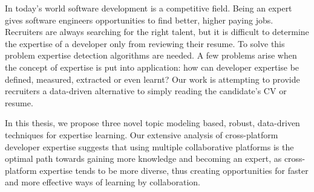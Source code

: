 In today's world software development is a competitive field. Being an expert gives software engineers opportunities to find better, higher paying jobs. Recruiters are always searching for the right talent, but it is difficult to determine the expertise of a developer only from reviewing their resume. To solve this problem expertise detection algorithms are needed. A few problems arise when the concept of expertise is put into application: how can developer expertise be defined, measured, extracted or even learnt? Our work is attempting to provide recruiters a data-driven alternative to simply reading the candidate's CV or resume. 

In this thesis, we propose three novel topic modeling based, robust, data-driven techniques for expertise learning. Our extensive analysis of cross-platform developer expertise suggests that using multiple collaborative platforms is the optimal path towards gaining more knowledge and becoming an expert, as cross-platform expertise tends to be more diverse, thus creating opportunities for faster and more effective ways of learning by collaboration.

